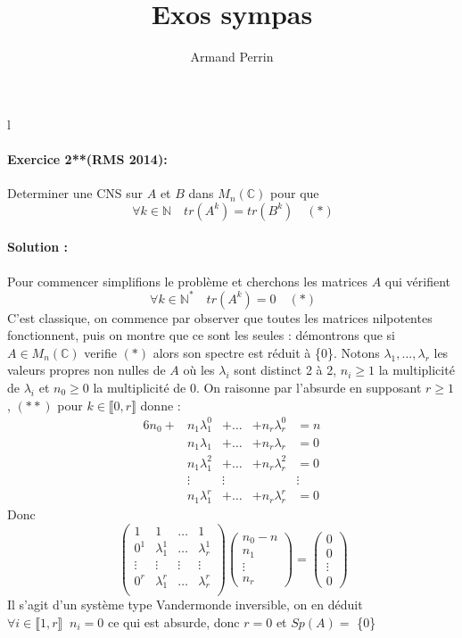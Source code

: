 \documentclass[letterpaper,10pt]{article}
\title{Exos sympas}
\author{Armand Perrin}
\begin{document}
\maketitle%

l
\paragraph{Exercice 2**(RMS 2014):}

Determiner une CNS sur $A$ et $B$ dans $M_n(\mathbb{C})$ pour que \[\
\forall k \in \mathbb{N} \quad tr(A^k) = tr(B^k) \quad (*) \]
\paragraph{Solution :}
Pour commencer simplifions le problème et cherchons les matrices $A$ qui vérifient \[\
\forall k \in \mathbb{N^*}\quad tr(A^k) = 0
\quad (*) \] C'est classique, on commence par observer que toutes les matrices 
nilpotentes fonctionnent, puis on montre que ce sont les seules : démontrons que si $A \in M_n(\mathbb{C}) $ verifie $(*)$ alors son spectre est réduit à \{0\}. Notons $ \lambda_1,..., \lambda_r$ les valeurs propres non nulles de $A$ où les $\lambda_i$ sont distinct 2 à 2, $n_i \geq 1$ la multiplicité de $\lambda_i$ et $n_0 \geq 0$ la multiplicité de 0. On raisonne par l'absurde en supposant $r \geq 1$,
$(**)$ pour $k\in \llbracket 0, r \rrbracket $ donne : 
\begin{alignat*}{6}
n_0 + &n_1\lambda_1^0 &+\ldots &+n_r\lambda_r^0 & = n\\
&n_1\lambda_1 &+\ldots&+n_r\lambda_r  &= 0\\
&n_1\lambda_1^2 &+\ldots&+n_r\lambda_r^2 &= 0 \\
&\vdots &\vdots  & & \vdots \\
&n_1\lambda_1^{r} &+\ldots&+n_r\lambda_r^{r} &= 0
\end{alignat*}
Donc 
\[\ \begin{pmatrix}
1 & 1 &\ldots & 1 \\
0^1 & \lambda_1^1 & \ldots & \lambda_r^1 \\
\vdots & \vdots & \vdots & \vdots \\
0^r & \lambda_1^r & \ldots & \lambda_r^r \\
\end{pmatrix}\begin{pmatrix}n_0-n \\ n_1\\ \vdots \\ n_r
\end{pmatrix}
=\begin{pmatrix}0 \\ 0\\ \vdots \\ 0
\end{pmatrix}\]
Il s'agit d'un système type Vandermonde  inversible,
on en déduit $\forall i \in\llbracket 1, r\rrbracket \;\; n_i = 0 $ ce qui est absurde, donc $r = 0$ et $Sp(A) =$ \{0\}
\end{document}
